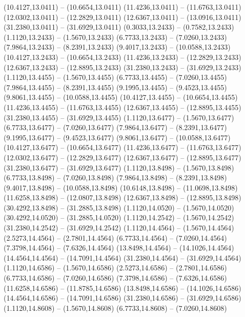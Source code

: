{\begin{scope}[shift={(#1,#2)}]
    (10.4127,13.0411) -- (10.6654,13.0411)
    (11.4236,13.0411) -- (11.6763,13.0411)
    (12.0302,13.0411) -- (12.2829,13.0411)
    (12.6367,13.0411) -- (13.0916,13.0411)
    (31.2380,13.0411) -- (31.6929,13.0411)
    (0.3033,13.2433) -- (0.7582,13.2433)
    (1.1120,13.2433) -- (1.5670,13.2433)
    (6.7733,13.2433) -- (7.0260,13.2433)
    (7.9864,13.2433) -- (8.2391,13.2433)
    (9.4017,13.2433) -- (10.0588,13.2433)
    (10.4127,13.2433) -- (10.6654,13.2433)
    (11.4236,13.2433) -- (12.2829,13.2433)
    (12.6367,13.2433) -- (12.8895,13.2433)
    (31.2380,13.2433) -- (31.6929,13.2433)
    (1.1120,13.4455) -- (1.5670,13.4455)
    (6.7733,13.4455) -- (7.0260,13.4455)
    (7.9864,13.4455) -- (8.2391,13.4455)
    (9.1995,13.4455) -- (9.4523,13.4455)
    (9.8061,13.4455) -- (10.0588,13.4455)
    (10.4127,13.4455) -- (10.6654,13.4455)
    (11.4236,13.4455) -- (11.6763,13.4455)
    (12.6367,13.4455) -- (12.8895,13.4455)
    (31.2380,13.4455) -- (31.6929,13.4455)
    (1.1120,13.6477) -- (1.5670,13.6477)
    (6.7733,13.6477) -- (7.0260,13.6477)
    (7.9864,13.6477) -- (8.2391,13.6477)
    (9.1995,13.6477) -- (9.4523,13.6477)
    (9.8061,13.6477) -- (10.0588,13.6477)
    (10.4127,13.6477) -- (10.6654,13.6477)
    (11.4236,13.6477) -- (11.6763,13.6477)
    (12.0302,13.6477) -- (12.2829,13.6477)
    (12.6367,13.6477) -- (12.8895,13.6477)
    (31.2380,13.6477) -- (31.6929,13.6477)
    (1.1120,13.8498) -- (1.5670,13.8498)
    (6.7733,13.8498) -- (7.0260,13.8498)
    (7.9864,13.8498) -- (8.2391,13.8498)
    (9.4017,13.8498) -- (10.0588,13.8498)
    (10.6148,13.8498) -- (11.0698,13.8498)
    (11.6258,13.8498) -- (12.0807,13.8498)
    (12.6367,13.8498) -- (12.8895,13.8498)
    (30.4292,13.8498) -- (31.2885,13.8498)
    (1.1120,14.0520) -- (1.5670,14.0520)
    (30.4292,14.0520) -- (31.2885,14.0520)
    (1.1120,14.2542) -- (1.5670,14.2542)
    (31.2380,14.2542) -- (31.6929,14.2542)
    (1.1120,14.4564) -- (1.5670,14.4564)
    (2.5273,14.4564) -- (2.7801,14.4564)
    (6.7733,14.4564) -- (7.0260,14.4564)
    (7.3798,14.4564) -- (7.6326,14.4564)
    (13.8498,14.4564) -- (14.1026,14.4564)
    (14.4564,14.4564) -- (14.7091,14.4564)
    (31.2380,14.4564) -- (31.6929,14.4564)
    (1.1120,14.6586) -- (1.5670,14.6586)
    (2.5273,14.6586) -- (2.7801,14.6586)
    (6.7733,14.6586) -- (7.0260,14.6586)
    (7.3798,14.6586) -- (7.6326,14.6586)
    (11.6258,14.6586) -- (11.8785,14.6586)
    (13.8498,14.6586) -- (14.1026,14.6586)
    (14.4564,14.6586) -- (14.7091,14.6586)
    (31.2380,14.6586) -- (31.6929,14.6586)
    (1.1120,14.8608) -- (1.5670,14.8608)
    (6.7733,14.8608) -- (7.0260,14.8608)

\end{scope}}
